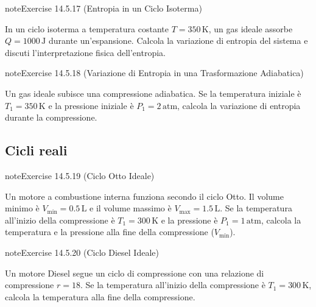 \documentclass[letterpaper,10pt,italian]{jupyterBook}
\begin{document}
\begin{sphinxadmonition}{note}{Exercise 14.5.17 (Entropia in un Ciclo Isoterma)}



\sphinxAtStartPar
In un ciclo isoterma a temperatura costante \(T = 350 \, \text{K}\), un gas ideale assorbe \(Q = 1000 \, \text{J}\) durante un’espansione. Calcola la variazione di entropia del sistema e discuti l’interpretazione fisica dell’entropia.
\end{sphinxadmonition}
 \label{exercise:ch/thermodynamics/heat-engine-problems-exercise-17}

\begin{sphinxadmonition}{note}{Exercise 14.5.18 (Variazione di Entropia in una Trasformazione Adiabatica)}



\sphinxAtStartPar
Un gas ideale subisce una compressione adiabatica. Se la temperatura iniziale è \(T_1 = 350 \, \text{K}\) e la pressione iniziale è \(P_1 = 2 \, \text{atm}\), calcola la variazione di entropia durante la compressione.
\end{sphinxadmonition}


\subsection{Cicli reali}
\label{\detokenize{ch/thermodynamics/heat-engine-problems:cicli-reali}} \label{exercise:ch/thermodynamics/heat-engine-problems-exercise-18}

\begin{sphinxadmonition}{note}{Exercise 14.5.19 (Ciclo Otto Ideale)}



\sphinxAtStartPar
Un motore a combustione interna funziona secondo il ciclo Otto. Il volume minimo è \(V_{\text{min}} = 0.5 \, \text{L}\) e il volume massimo è \(V_{\text{max}} = 1.5 \, \text{L}\). Se la temperatura all’inizio della compressione è \(T_1 = 300 \, \text{K}\) e la pressione è \(P_1 = 1 \, \text{atm}\), calcola la temperatura e la pressione alla fine della compressione (\(V_{\text{min}}\)).
\end{sphinxadmonition}
 \label{exercise:ch/thermodynamics/heat-engine-problems-exercise-19}

\begin{sphinxadmonition}{note}{Exercise 14.5.20 (Ciclo Diesel Ideale)}



\sphinxAtStartPar
Un motore Diesel segue un ciclo di compressione con una relazione di compressione \(r = 18\). Se la temperatura all’inizio della compressione è \(T_1 = 300 \, \text{K}\), calcola la temperatura alla fine della compressione.
\end{sphinxadmonition}
 \label{exercise:ch/thermodynamics/heat-engine-problems-exercise-20}
\end{document}
